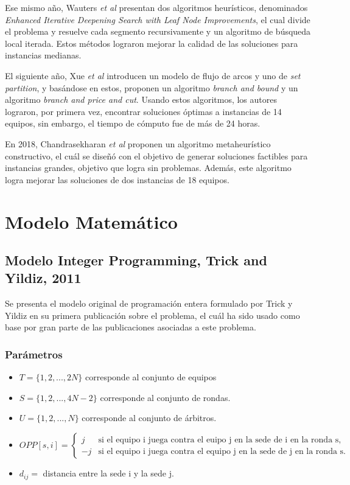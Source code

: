 \documentclass[letter, 10pt]{article}
\begin{document}
Ese mismo a\~no, Wauters \emph{et al} \cite{WAUTERS2014886} presentan dos algoritmos heur\'isticos, denominados \emph{Enhanced Iterative Deepening Search with Leaf Node Improvements}, el cual divide el problema y resuelve cada segmento recursivamente y un algoritmo de b\'usqueda local iterada. Estos m\'etodos lograron mejorar la calidad de las soluciones para instancias medianas.

El siguiente a\~no, Xue \emph{et al} \cite{XUE2015932} introducen un modelo de flujo de arcos y uno de \emph{set partition}, y bas\'andose en estos, proponen un algoritmo \emph{branch and bound} y un algoritmo \emph{branch and price and cut}. Usando estos algoritmos, los autores lograron, por primera vez, encontrar soluciones \'optimas a instancias de 14 equipos, sin embargo, el tiempo de c\'omputo fue de m\'as de 24 horas.

En 2018, Chandrasekharan \emph{et al} \cite{ChandrasekharanToffoloWauters+2019+41+57} proponen un algoritmo metaheur\'istico constructivo, el cu\'al se dise\~n\'o con el objetivo de generar soluciones factibles para instancias grandes, objetivo que logra sin problemas. Adem\'as, este algoritmo logra mejorar las soluciones de dos instancias de 18 equipos.

\section{Modelo Matem\'atico}

\subsection{Modelo Integer Programming, Trick and Yildiz, 2011}

Se presenta el modelo original de programaci\'on entera formulado por Trick y Yildiz \cite{trick_yildiz_2011} en su primera publicaci\'on sobre el problema, el cu\'al ha sido usado como base por gran parte de las publicaciones asociadas a este problema.

\subsubsection{Par\'ametros}
\begin{itemize}
  \item $T = \{1, 2, ..., 2N\} $ corresponde al conjunto de equipos
  \item $S = \{1, 2, ..., 4N-2\}$ corresponde al conjunto de rondas.
  \item $U = \{1, 2, ..., N \}$ corresponde al conjunto de \'arbitros.
  \item $
          OPP[s, i] = \begin{cases}
            j  & \text{si el equipo i juega contra el euipo j en la sede de i en la ronda s},  \\
            -j & \text{si el equipo i juega contra el equipo j en la sede de j en la ronda s}.
          \end{cases}
        $
  \item $d_{ij} = $ distancia entre la sede i y la sede j.
\end{itemize}
\end{document}
